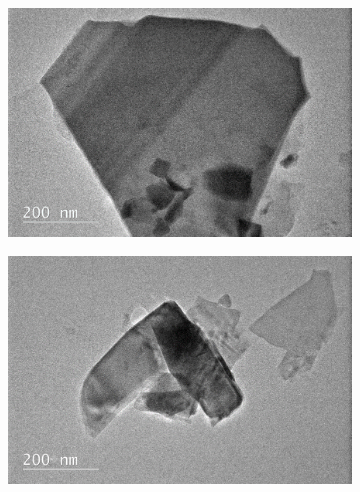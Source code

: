 \begin{figure}[H]
	\begin{center}
		\begin{subfigure}[b]{0.6\textwidth}
			\includegraphics[width=\textwidth]{In/TEMImage1.png}
			\caption{}
			\label{fig:InTEMImage1}
		\end{subfigure}

		\begin{subfigure}[b]{0.6\textwidth}
			\includegraphics[width=\textwidth]{In/TEMImage2.png}
			\caption{}
			\label{fig:InTEMImage2}
		\end{subfigure}


\end{center}
\end{figure}

